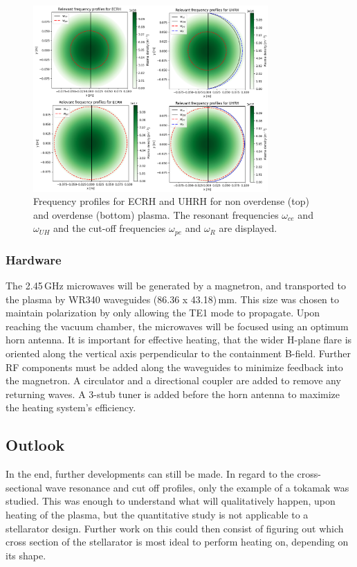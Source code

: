\begin{figure}[H]
  \centering
  \includegraphics[width=0.8\textwidth]{Images/05_Heating/freq_profiles.png}
  \caption{Frequency profiles for ECRH and UHRH for non overdense (top) and overdense (bottom) plasma. The resonant frequencies $\omega_{ce}$ and $\omega_{UH}$ and the cut-off frequencies $\omega_{pe}$ and $\omega_R$ are displayed.}
  \label{fig:freq_profiles}
\end{figure}




\subsubsection{Hardware}    %

The 2.45\,GHz microwaves will be generated by a magnetron, and transported to the plasma by WR340 waveguides (86.36 x 43.18)\,mm. This size was chosen to maintain polarization by only allowing the TE1 mode to propagate. Upon reaching the vacuum chamber, the microwaves will be focused using an optimum horn antenna. It is important for effective heating, that the wider H-plane flare is oriented along the vertical axis perpendicular to the containment B-field.
Further RF components must be added along the waveguides to minimize feedback into the magnetron. A circulator and a directional coupler are added to remove any returning waves. A 3-stub tuner is added before the horn antenna to maximize the heating system's efficiency.
\subsection{Outlook}
In the end, further developments can still be made.
In regard to the cross-sectional wave resonance and cut off profiles, only the example of a tokamak was studied.
This was enough to understand what will qualitatively happen, upon heating of the plasma, but the quantitative study is not applicable to a stellarator design.
Further work on this could then consist of figuring out which cross section of the stellarator is most ideal to perform heating on, depending on its shape.

